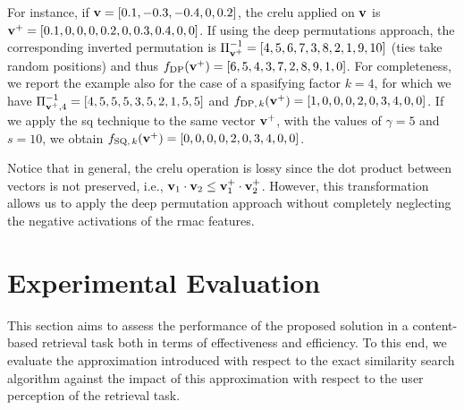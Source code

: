 For instance, if $\mathbf{v} = [0.1, -0.3, -0.4, 0, 0.2]$, the \gls{crelu} applied on $\mathbf{v}$ is $\mathbf{v}^+ = [0.1, 0, 0, 0, 0.2, 0, 0.3, 0.4, 0, 0]$.
If using the deep permutations approach, the corresponding inverted permutation is $\Pi^{-1}_{\mathbf{v}^+} = [4, 5, 6, 7, 3, 8, 2, 1, 9, 10]$ (ties take random positions) and thus $f_\text{DP}(\mathbf{v}^+) = [6, 5, 4, 3, 7, 2, 8, 9, 1, 0]$.
For completeness, we report the example also for the case of a spasifying factor $k=4$, for which we have $\Pi^{-1}_{\mathbf{v}^+,4} = [4, 5, 5, 5, 3, 5, 2, 1, 5, 5]$ and $f_{\text{DP},\, k}(\mathbf{v}^+) = [1, 0, 0, 0, 2, 0, 3, 4, 0, 0]$.
If we apply the \gls{sq} technique to the same vector $\mathbf{v}^+$, with the values of $\gamma = 5$ and $s=10$, we obtain $f_{\text{SQ}, \, k}(\mathbf{v}^+) = [0, 0, 0, 0, 2, 0, 3, 4, 0, 0]$.

Notice that in general, the \gls{crelu} operation is lossy since the dot product between vectors is not preserved, i.e., $\mathbf{v}_1 \cdot \mathbf{v}_2 \leq \mathbf{v}_1^+ \cdot \mathbf{v}_2^+$.
However, this transformation allows us to apply the deep permutation approach without completely neglecting the negative activations of the \gls{rmac} features.

\section{Experimental Evaluation}
\label{sec:str:experiments}

This section aims to assess the performance of the proposed solution in a content-based retrieval task both in terms of effectiveness and efficiency.
To this end, we evaluate the approximation introduced with respect to the exact similarity search algorithm against the impact of this approximation with respect to the user perception of the retrieval task.

